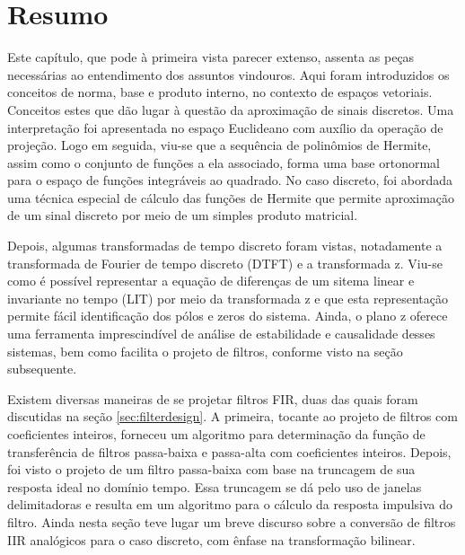\section{Resumo}
Este capítulo, que pode à primeira vista parecer extenso, assenta as peças necessárias ao entendimento dos assuntos vindouros. Aqui foram introduzidos os conceitos de norma, base e produto interno, no contexto de espaços vetoriais. Conceitos estes que dão lugar à questão da aproximação de sinais discretos. Uma interpretação foi apresentada no espaço Euclideano com auxílio da operação de projeção. Logo em seguida, viu-se que a sequência de polinômios de Hermite, assim como o conjunto de funções a ela associado, forma uma base ortonormal para o espaço de funções integráveis ao quadrado. No caso discreto, foi abordada uma técnica especial de cálculo das funções de Hermite que permite aproximação de um sinal discreto por meio de um simples produto matricial.

Depois, algumas transformadas de tempo discreto foram vistas, notadamente a transformada de Fourier de tempo discreto (DTFT) e a transformada z. Viu-se como é possível representar a equação de diferenças de um sitema linear e invariante no tempo (LIT) por meio da transformada z e que esta representação permite fácil identificação dos pólos e zeros do sistema. Ainda, o plano z oferece uma ferramenta imprescindível de análise de estabilidade e causalidade desses sistemas, bem como facilita o projeto de filtros, conforme visto na seção subsequente.

Existem diversas maneiras de se projetar filtros FIR, duas das quais foram discutidas na seção \ref{sec:filterdesign}. A primeira, tocante ao projeto de filtros com coeficientes inteiros, forneceu um algoritmo para determinação da função de transferência de filtros passa-baixa e passa-alta com coeficientes inteiros. Depois, foi visto o projeto de um filtro passa-baixa com base na truncagem de sua resposta ideal no domínio tempo. Essa truncagem se dá pelo uso de janelas delimitadoras e resulta em um algoritmo para o cálculo da resposta impulsiva do filtro. Ainda nesta seção teve lugar um breve discurso sobre a conversão de filtros IIR analógicos para o caso discreto, com ênfase na transformação bilinear.